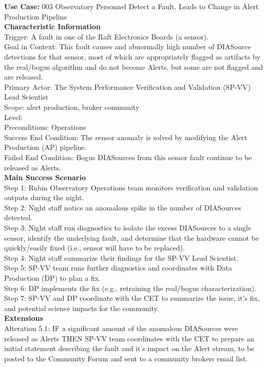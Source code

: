 {\bf Use Case:} 003 Observatory Personnel Detect a Fault, Leads to Change in Alert Production Pipeline \\

{\bf Characteristic Information} \\
Trigger: A fault in one of the Raft Electronics Boards (a sensor). \\
Goal in Context: This fault causes and abnormally high number of DIASource detections for that sensor, most of which are appropriately flagged as artifacts by the real/bogus algorithm and do not become Alerts, but some are not flagged and are released. \\
Primary Actor: The System Performance Verification and Validation (SP-VV) Lead Scientist \\
Scope: alert production, broker community \\
Level: \\
Preconditions: Operations \\
Success End Condition: The sensor anomaly is solved by modifying the Alert Production (AP) pipeline. \\
Failed End Condition: Bogus DIASources from this sensor fault continue to be released as Alerts. \\

{\bf Main Success Scenario} \\
Step 1: Rubin Observatory Operations team monitors verification and validation outputs during the night. \\
Step 2: Night staff notice an anomalous spike in the number of DIASources detected. \\
Step 3: Night staff run diagnostics to isolate the excess DIASources to a single sensor, identify the underlying fault, and determine that the hardware cannot be quickly/easily fixed (i.e., sensor will have to be replaced). \\
Step 4: Night staff summarize their findings for the SP-VV Lead Scientist. \\
Step 5: SP-VV team runs further diagnostics and coordinates with Data Production (DP) to plan a fix. \\
Step 6: DP implements the fix (e.g., retraining the real/bogus characterization). \\
Step 7: SP-VV and DP coordinate with the CET to summarize the issue, it's fix, and potential science impacts for the community. \\

{\bf Extensions} \\
Alteration 5.1: IF a significant amount of the anomalous DIASources were released as Alerts THEN SP-VV team coordinates with the CET to prepare an initial statement describing the fault and it's impact on the Alert stream, to be posted to the Community Forum and sent to a community brokers email list. \\

